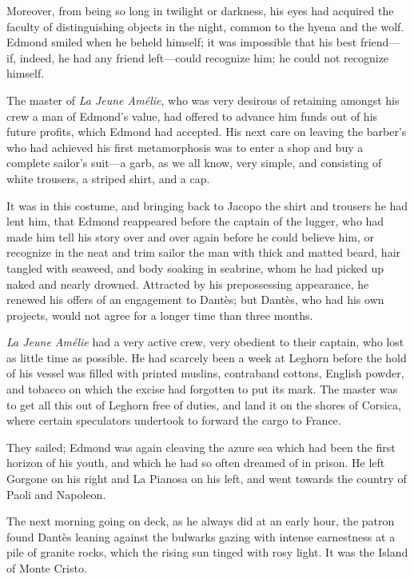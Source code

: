 Moreover, from being so long in twilight or darkness, his eyes had acquired the faculty of distinguishing objects in the night, common to the hyena and the wolf. Edmond smiled when he beheld himself; it was impossible that his best friend—if, indeed, he had any friend left—could recognize him; he could not recognize himself. 

 The master of \textit{La Jeune Amélie}, who was very desirous of retaining amongst his crew a man of Edmond's value, had offered to advance him funds out of his future profits, which Edmond had accepted. His next care on leaving the barber's who had achieved his first metamorphosis was to enter a shop and buy a complete sailor's suit—a garb, as we all know, very simple, and consisting of white trousers, a striped shirt, and a cap. 

 It was in this costume, and bringing back to Jacopo the shirt and trousers he had lent him, that Edmond reappeared before the captain of the lugger, who had made him tell his story over and over again before he could believe him, or recognize in the neat and trim sailor the man with thick and matted beard, hair tangled with seaweed, and body soaking in seabrine, whom he had picked up naked and nearly drowned. Attracted by his prepossessing appearance, he renewed his offers of an engagement to Dantès; but Dantès, who had his own projects, would not agree for a longer time than three months. 

 \textit{La Jeune Amélie} had a very active crew, very obedient to their captain, who lost as little time as possible. He had scarcely been a week at Leghorn before the hold of his vessel was filled with printed muslins, contraband cottons, English powder, and tobacco on which the excise had forgotten to put its mark. The master was to get all this out of Leghorn free of duties, and land it on the shores of Corsica, where certain speculators undertook to forward the cargo to France. 

 They sailed; Edmond was again cleaving the azure sea which had been the first horizon of his youth, and which he had so often dreamed of in prison. He left Gorgone on his right and La Pianosa on his left, and went towards the country of Paoli and Napoleon. 

 The next morning going on deck, as he always did at an early hour, the patron found Dantès leaning against the bulwarks gazing with intense earnestness at a pile of granite rocks, which the rising sun tinged with rosy light. It was the Island of Monte Cristo. 

